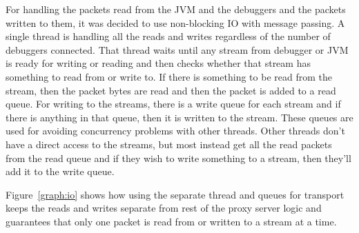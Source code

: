\documentclass[..thesis.tex]{subfiles}
\begin{document}
For handling the packets read from the JVM and the debuggers and the packets written to them, it was decided to use non-blocking IO with message passing.
A single thread is handling all the reads and writes regardless of the number of debuggers connected.
That thread waits until any stream from debugger or JVM is ready for writing or reading and then checks whether that stream has something to read from or write to.
If there is something to be read from the stream, then the packet bytes are read and then the packet is added to a read queue.
For writing to the streams, there is a write queue for each stream and if there is anything in that queue, then it is written to the stream.
These queues are used for avoiding concurrency problems with other threads.
Other threads don't have a direct access to the streams, but most instead get all the read packets from the read queue and if they wish to write something to a stream, then they'll add it to the write queue.



Figure~\ref{graph:io} shows how using the separate thread and queues for transport keeps the reads and writes separate from rest of the proxy server logic and guarantees that only one packet is read from or written to a stream at a time.
\end{document}
